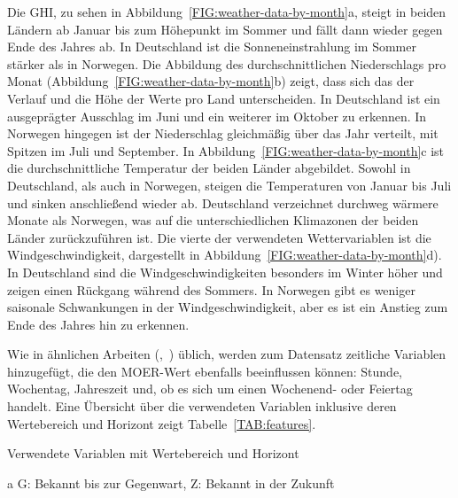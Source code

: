 Die \ac{GHI}, zu sehen in Abbildung~\ref{FIG:weather-data-by-month}a, steigt in beiden Ländern ab Januar bis zum Höhepunkt im Sommer und fällt dann wieder gegen Ende des Jahres ab.
In Deutschland ist die Sonneneinstrahlung im Sommer stärker als in Norwegen.
Die Abbildung des durchschnittlichen Niederschlags pro Monat (Abbildung~\ref{FIG:weather-data-by-month}b) zeigt, dass sich das der Verlauf und die Höhe der Werte pro Land unterscheiden.
In Deutschland ist ein ausgeprägter Ausschlag im Juni und ein weiterer im Oktober zu erkennen.
In Norwegen hingegen ist der Niederschlag gleichmäßig über das Jahr verteilt, mit Spitzen im Juli und September.
In Abbildung~\ref{FIG:weather-data-by-month}c ist die durchschnittliche Temperatur der beiden Länder abgebildet.
Sowohl in Deutschland, als auch in Norwegen, steigen die Temperaturen von Januar bis Juli und sinken anschließend wieder ab.
Deutschland verzeichnet durchweg wärmere Monate als Norwegen, was auf die unterschiedlichen Klimazonen der beiden Länder zurückzuführen ist.
Die vierte der verwendeten Wettervariablen ist die Windgeschwindigkeit, dargestellt in Abbildung~\ref{FIG:weather-data-by-month}d).
In Deutschland sind die Windgeschwindigkeiten besonders im Winter höher und zeigen einen Rückgang während des Sommers.
In Norwegen gibt es weniger saisonale Schwankungen in der Windgeschwindigkeit, aber es ist ein Anstieg zum Ende des Jahres hin zu erkennen.

Wie in ähnlichen Arbeiten (\cite{Giacomazzi.06202023},~\cite{Labiadh.2.8.2023}) üblich, werden zum Datensatz zeitliche Variablen hinzugefügt, die den MOER-Wert ebenfalls beeinflussen können:
Stunde, Wochentag, Jahreszeit und, ob es sich um einen Wochenend- oder Feiertag handelt.
Eine Übersicht über die verwendeten Variablen inklusive deren Wertebereich und Horizont zeigt Tabelle~\ref{TAB:features}.
\begin{table}[ht]
 \centering
 \begin{threeparttable}
  \caption{Verwendete Variablen mit Wertebereich und Horizont}
  \label{TAB:features}
  
  \begin{tablenotes}
   \item[a] G: Bekannt bis zur Gegenwart, Z: Bekannt in der Zukunft
  \end{tablenotes}
 \end{threeparttable}
\end{table}

